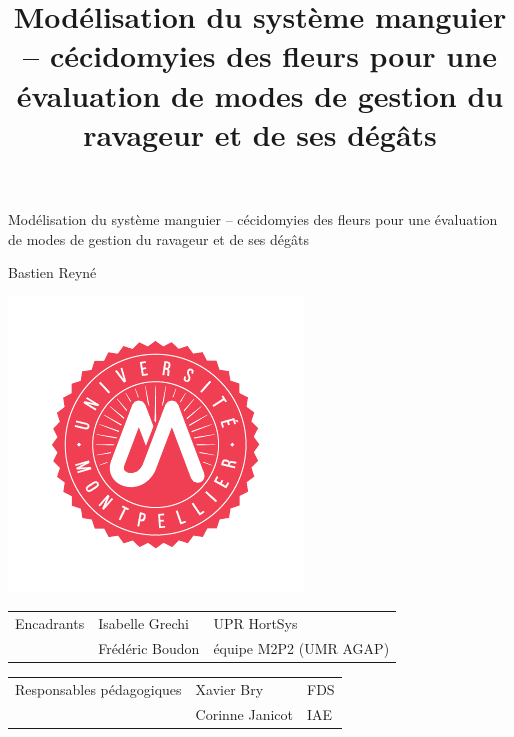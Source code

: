 \documentclass[xcolor={dvipsnames}]{beamer}
\title{Modélisation du système manguier -- cécidomyies des fleurs pour une évaluation de modes de gestion du ravageur et de ses dégâts}
\date{}
\author{}
\begin{document}
\begin{frame}



\begin{center}
 {\color{bleu} \Large Modélisation du système manguier – cécidomyies
des fleurs pour une évaluation de modes de gestion
du ravageur et de ses dégâts}
\vspace{0.5cm}

Bastien Reyné
\end{center}

 \begin{center}
 \includegraphics[scale = 0.35]{um.pdf}
 \hspace{0.8cm}
 \end{center}
 

{\small \begin{tabular}{lll}
{Encadrants} & Isabelle Grechi & UPR HortSys\\
 & Frédéric Boudon & équipe M2P2 (UMR AGAP)\\
 \end{tabular}
}
 \vspace{0.5cm}
 
{\small \begin{tabular}{lll}
Responsables pédagogiques & Xavier Bry & FDS\\
 & Corinne Janicot & IAE
 \end{tabular}
} 
\end{frame}
\end{document}
